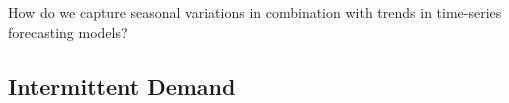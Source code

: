 \begin{exercise}
How do we capture seasonal variations in combination with trends in time-series forecasting models?

\end{exercise}

\subsection{Intermittent Demand}

